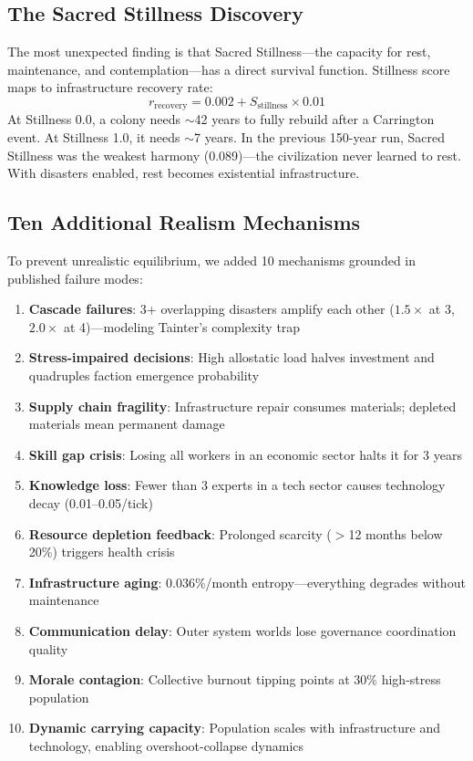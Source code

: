 \documentclass[12pt,a4paper]{article}
\begin{document}
\subsection{The Sacred Stillness Discovery}

The most unexpected finding is that Sacred Stillness---the capacity for rest, maintenance, and contemplation---has a direct survival function. Stillness score maps to infrastructure recovery rate:
\begin{equation}
    r_\text{recovery} = 0.002 + S_\text{stillness} \times 0.01
\end{equation}
At Stillness 0.0, a colony needs $\sim$42 years to fully rebuild after a Carrington event. At Stillness 1.0, it needs $\sim$7 years. In the previous 150-year run, Sacred Stillness was the weakest harmony (0.089)---the civilization never learned to rest. With disasters enabled, rest becomes existential infrastructure.

\subsection{Ten Additional Realism Mechanisms}

To prevent unrealistic equilibrium, we added 10 mechanisms grounded in published failure modes:

\begin{enumerate}
    \item \textbf{Cascade failures}: 3+ overlapping disasters amplify each other ($1.5\times$ at 3, $2.0\times$ at 4)---modeling Tainter's complexity trap
    \item \textbf{Stress-impaired decisions}: High allostatic load halves investment and quadruples faction emergence probability
    \item \textbf{Supply chain fragility}: Infrastructure repair consumes materials; depleted materials mean permanent damage
    \item \textbf{Skill gap crisis}: Losing all workers in an economic sector halts it for 3 years
    \item \textbf{Knowledge loss}: Fewer than 3 experts in a tech sector causes technology decay (0.01--0.05/tick)
    \item \textbf{Resource depletion feedback}: Prolonged scarcity ($>$12 months below 20\%) triggers health crisis
    \item \textbf{Infrastructure aging}: 0.036\%/month entropy---everything degrades without maintenance
    \item \textbf{Communication delay}: Outer system worlds lose governance coordination quality
    \item \textbf{Morale contagion}: Collective burnout tipping points at 30\% high-stress population
    \item \textbf{Dynamic carrying capacity}: Population scales with infrastructure and technology, enabling overshoot-collapse dynamics
\end{enumerate}
\end{document}
